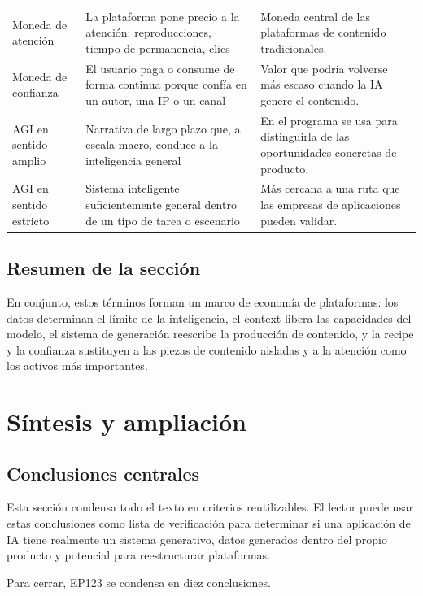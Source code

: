\documentclass[a4paper]{article}
\begin{document}
\begin{longtable}{p{}p{}p{}}
Moneda de atención & La plataforma pone precio a la atención: reproducciones, tiempo de permanencia, clics & Moneda central de las plataformas de contenido tradicionales. \\
Moneda de confianza & El usuario paga o consume de forma continua porque confía en un autor, una IP o un canal & Valor que podría volverse más escaso cuando la IA genere el contenido. \\
AGI en sentido amplio & Narrativa de largo plazo que, a escala macro, conduce a la inteligencia general & En el programa se usa para distinguirla de las oportunidades concretas de producto. \\
AGI en sentido estricto & Sistema inteligente suficientemente general dentro de un tipo de tarea o escenario & Más cercana a una ruta que las empresas de aplicaciones pueden validar. \\
\bottomrule
\end{longtable}

\subsection{Resumen de la sección}

En conjunto, estos términos forman un marco de economía de plataformas: los datos determinan el límite de la inteligencia, el context libera las capacidades del modelo, el sistema de generación reescribe la producción de contenido, y la recipe y la confianza sustituyen a las piezas de contenido aisladas y a la atención como los activos más importantes.
\section{Síntesis y ampliación}

\subsection{Conclusiones centrales}

Esta sección condensa todo el texto en criterios reutilizables. El lector puede usar estas conclusiones como lista de verificación para determinar si una aplicación de IA tiene realmente un sistema generativo, datos generados dentro del propio producto y potencial para reestructurar plataformas.

Para cerrar, EP123 se condensa en diez conclusiones.
\end{document}
